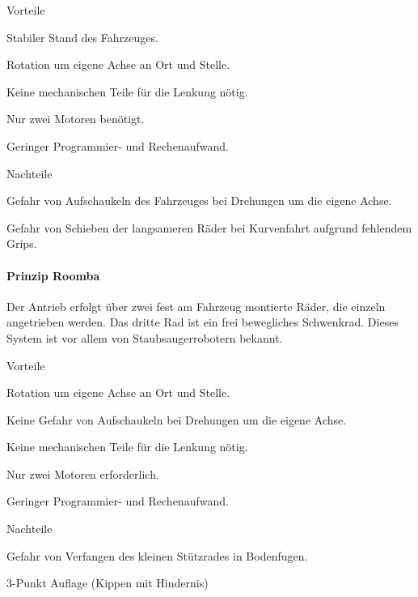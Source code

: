 \documentclass[../main.tex]{subfiles}
\begin{document}
\begin{minipage}[t]{0.48\textwidth}
    \begin{items}
        \item[Vorteile]
        \item Stabiler Stand des Fahrzeuges.
        \item Rotation um eigene Achse an Ort und Stelle.
        \item Keine mechanischen Teile für die Lenkung nötig.
        \item Nur zwei Motoren benötigt.
        \item Geringer Programmier- und Rechenaufwand.
    \end{items}
\end{minipage}
\begin{minipage}[t]{0.48\textwidth}
    \begin{items}
      \item [Nachteile]
      \item Gefahr von Aufschaukeln des Fahrzeuges bei Drehungen um die eigene Achse.
      \item Gefahr von Schieben der langsameren Räder bei Kurvenfahrt aufgrund fehlendem Grips.
    \end{items}
\end{minipage}

\paragraph{Prinzip Roomba} \label{recherche-prinzip-roomba}
Der Antrieb erfolgt über zwei fest am Fahrzeug montierte Räder, die einzeln angetrieben werden. Das dritte Rad ist ein frei bewegliches Schwenkrad. Dieses System ist vor allem von Staubsaugerrobotern bekannt.

\begin{minipage}[t]{0.48\textwidth}
    \begin{items}
        \item[Vorteile]
        \item Rotation um eigene Achse an Ort und Stelle.
        \item Keine Gefahr von Aufschaukeln bei Drehungen um die eigene Achse.
        \item Keine mechanischen Teile für die Lenkung nötig.
        \item Nur zwei Motoren erforderlich.
         \item Geringer Programmier- und Rechenaufwand.
    \end{items}
\end{minipage}
\begin{minipage}[t]{0.48\textwidth}
    \begin{items}
      \item [Nachteile]
      \item Gefahr von Verfangen des kleinen Stützrades in Bodenfugen.
      \item 3-Punkt Auflage (Kippen mit Hindernis)
    \end{items}
\end{minipage}
\end{document}
